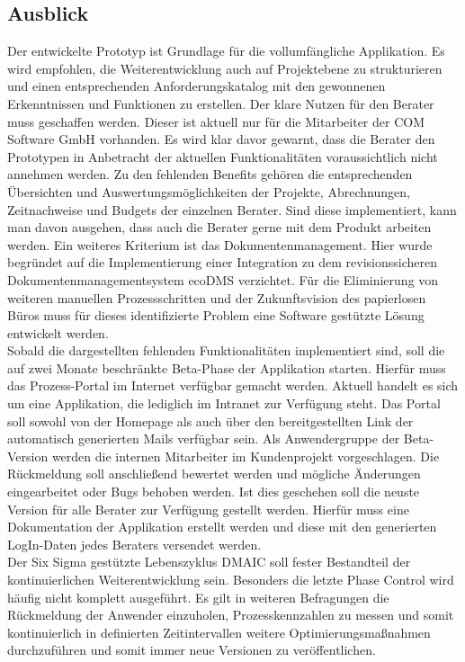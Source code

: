 \subsection{Ausblick}
Der entwickelte Prototyp ist Grundlage für die vollumfängliche Applikation. Es wird empfohlen, die Weiterentwicklung auch auf Projektebene zu strukturieren und einen entsprechenden Anforderungskatalog mit den gewonnenen Erkenntnissen und Funktionen zu erstellen. Der klare Nutzen für den Berater muss geschaffen werden. Dieser ist aktuell nur für die Mitarbeiter der COM Software GmbH vorhanden. Es wird klar davor gewarnt, dass die Berater den Prototypen in Anbetracht der aktuellen Funktionalitäten voraussichtlich nicht annehmen werden. Zu den fehlenden Benefits gehören die entsprechenden Übersichten und Auswertungsmöglichkeiten der Projekte, Abrechnungen, Zeitnachweise und Budgets der einzelnen Berater. Sind diese implementiert, kann man davon ausgehen, dass auch die Berater gerne mit dem Produkt arbeiten werden. Ein weiteres Kriterium ist das Dokumentenmanagement. Hier wurde begründet auf die Implementierung einer Integration zu dem revisionssicheren Dokumentenmanagementsystem ecoDMS verzichtet. Für die Eliminierung von weiteren manuellen Prozessschritten und der Zukunftsvision des papierlosen Büros muss für dieses identifizierte Problem eine Software gestützte Lösung entwickelt werden. \\
Sobald die dargestellten fehlenden Funktionalitäten implementiert sind, soll die auf zwei Monate beschränkte Beta-Phase der Applikation starten. Hierfür muss das Prozess-Portal im Internet verfügbar gemacht werden. Aktuell handelt es sich um eine Applikation, die lediglich im Intranet zur Verfügung steht. Das Portal soll sowohl von der Homepage als auch über den bereitgestellten Link der automatisch generierten Mails verfügbar sein. Als Anwendergruppe der Beta-Version werden die internen Mitarbeiter im Kundenprojekt vorgeschlagen. Die Rückmeldung soll anschließend bewertet werden und mögliche Änderungen eingearbeitet oder Bugs behoben werden. Ist dies geschehen soll die neuste Version für alle Berater zur Verfügung gestellt werden. Hierfür muss eine Dokumentation der Applikation erstellt werden und diese mit den generierten LogIn-Daten jedes Beraters versendet werden. \\
Der Six Sigma gestützte Lebenszyklus DMAIC soll fester Bestandteil der kontinuierlichen Weiterentwicklung sein. Besonders die letzte Phase \glqq Control\grqq{} wird häufig nicht komplett ausgeführt. Es gilt in weiteren Befragungen die Rückmeldung der Anwender einzuholen, Prozesskennzahlen zu messen und somit kontinuierlich in definierten Zeitintervallen weitere Optimierungsmaßnahmen durchzuführen und somit immer neue Versionen zu veröffentlichen. 
